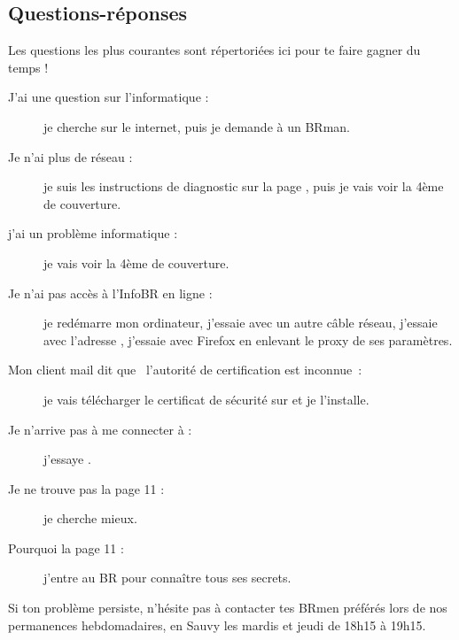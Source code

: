 \subsection{Questions-réponses}

Les questions les plus courantes sont répertoriées ici pour te faire gagner du temps !

\begin{description}

\item[J'ai une question sur l'informatique : ] je cherche sur le internet, puis je demande à un BRman.

\item[Je n'ai plus de réseau : ] je suis les instructions de diagnostic sur la page \pageref{diagnostic}, puis je vais voir la 4ème de couverture.

\item[j'ai un problème informatique : ] je vais voir la 4ème de couverture.

\item[Je n'ai pas accès à l'InfoBR en ligne : ] je redémarre mon ordinateur, j'essaie avec un autre câble réseau, j'essaie avec l'adresse , j'essaie avec Firefox en enlevant le proxy de ses paramètres.

\item[Mon client mail dit que \guillemotleft~l'autorité de certification est inconnue~\guillemotright : ] je vais télécharger le certificat de sécurité
sur  et je l'installe.


\item[Je n'arrive pas à me connecter à  : ] j'essaye .



\item[Je ne trouve pas la page 11 : ] je cherche mieux.

\item[Pourquoi la page 11 : ] j'entre au BR pour connaître tous ses secrets.

\end{description}

Si ton problème persiste, n'hésite pas à contacter tes BRmen préférés lors de nos permanences hebdomadaires, en Sauvy les mardis et jeudi de 18h15 à 19h15.